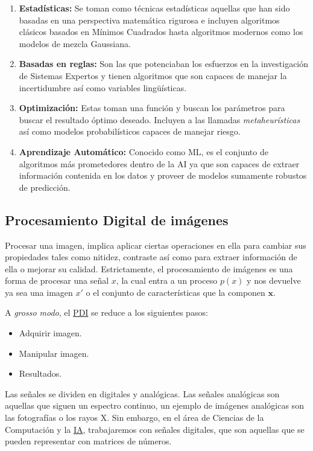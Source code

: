 \begin{enumerate}
    \item{\textbf{Estadísticas: }} Se toman como técnicas estadísticas aquellas que han sido basadas en una perspectiva
    matemática rigurosa e incluyen algoritmos clásicos basados en Mínimos Cuadrados hasta algoritmos modernos
    como los modelos de mezcla Gaussiana.
    \item{\textbf{Basadas en reglas: }} Son las que potenciaban los esfuerzos en la investigación de Sistemas Expertos
    y tienen algoritmos que son capaces de manejar la incertidumbre así como variables lingüísticas.
    \item{\textbf{Optimización: }} Estas toman una función y buscan los parámetros para buscar el resultado óptimo deseado.
    Incluyen a las llamadas \emph{metaheurísticas} así como modelos probabilísticos capaces de manejar riesgo.
    \item{\textbf{Aprendizaje Automático: }} Conocido como ML, es el conjunto de algoritmos más prometedores dentro de la AI
    ya que son capaces de extraer información contenida en los datos y proveer de modelos sumamente robustos de predicción.
\end{enumerate}

\subsection{Procesamiento Digital de imágenes}

Procesar una imagen, implica aplicar ciertas operaciones en ella para cambiar
sus propiedades tales como nitidez, contraste así como para extraer información
de ella o mejorar su calidad. Estrictamente, el procesamiento de imágenes es una
forma de procesar una señal \(x\), la cual entra a un proceso \(p(x)\) y nos
devuelve ya sea una imagen \(x'\) o el conjunto de características que la
componen \(\mathbf{x}\).~\cite{UniversityofTartu}

A \emph{grosso modo}, el \hyperlink{abbr}{PDI} se reduce a los siguientes
pasos:

\begin{itemize}
    \item Adquirir imagen.
    \item Manipular imagen.
    \item Resultados.
\end{itemize}

Las señales se dividen en digitales y analógicas. Las señales analógicas
son aquellas que siguen un espectro continuo, un ejemplo de imágenes
analógicas son las fotografías o los rayos X. Sin embargo, en el área
de Ciencias de la Computación y la \hyperlink{abbr}{IA}, trabajaremos
con señales digitales, que son aquellas que se pueden representar con matrices de números.

